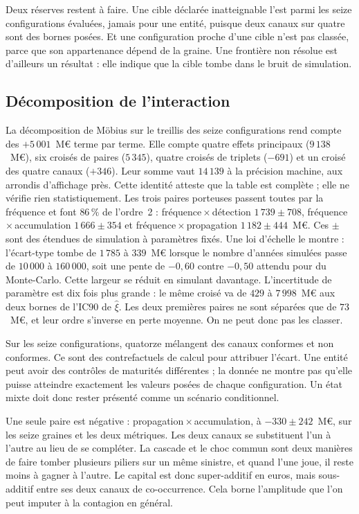 Deux réserves restent à faire. Une cible déclarée inatteignable l'est parmi les seize configurations
évaluées, jamais pour une entité, puisque deux canaux sur quatre sont des bornes posées. Et une configuration proche d'une cible n'est pas
classée, parce que son appartenance dépend de la graine. Une frontière non résolue est d'ailleurs un
résultat : elle indique que la cible tombe dans le bruit de simulation.

\subsection{Décomposition de l'interaction}
\label{sec:interaction-canaux}

La décomposition de Möbius
sur le treillis des seize configurations rend compte des $+5\,001$~M\euro{} terme par terme. Elle compte quatre
effets principaux ($9\,138$~M\euro), six croisés de paires ($5\,345$), quatre croisés de triplets
($-691$) et un croisé des quatre canaux ($+346$). Leur somme vaut $14\,139$ à la précision machine, aux arrondis d'affichage près.
Cette identité atteste que la table est complète ; elle ne vérifie rien statistiquement.
Les trois paires porteuses passent toutes par la fréquence et font $86\,\%$ de l'ordre~2 :
fréquence\,$\times$\,détection $1\,739\pm708$, fréquence\,$\times$\,accumulation $1\,666\pm354$ et
fréquence\,$\times$\,propagation $1\,182\pm444$~M\euro. Ces $\pm$ sont des étendues de simulation à
paramètres fixés. Une loi d'échelle le montre : l'écart-type tombe de $1\,785$ à $339$~M\euro{}
lorsque le nombre d'années simulées passe de $10\,000$ à $160\,000$, soit une pente de $-0{,}60$ contre
$-0{,}50$ attendu pour du Monte-Carlo. Cette largeur se réduit en simulant davantage. L'incertitude
de paramètre est dix fois plus grande : le même croisé va de $429$ à $7\,998$~M\euro{} aux deux bornes
de l'IC90 de $\hat\xi$. Les deux premières paires ne sont séparées que de $73$~M\euro{}, et leur ordre s'inverse en perte
moyenne. On ne peut donc pas les classer.

Sur les seize configurations, quatorze mélangent des canaux conformes et non conformes. Ce sont
des contrefactuels de calcul pour attribuer l'écart. Une entité peut avoir des contrôles de maturités
différentes ; la donnée ne montre pas qu'elle puisse atteindre exactement les valeurs posées de
chaque configuration. Un état mixte doit donc rester présenté comme un scénario conditionnel.

Une seule paire est négative : propagation\,$\times$\,accumulation, à $-330\pm242$~M\euro, sur les
seize graines et les deux métriques. Les deux canaux se substituent l'un à l'autre au lieu de se
compléter. La cascade et le choc commun sont deux manières de faire tomber plusieurs piliers sur un même
sinistre, et quand l'une joue, il reste moins à gagner à l'autre. Le capital est donc super-additif en
euros, mais sous-additif entre ses deux canaux de co-occurrence. Cela borne l'amplitude que l'on peut
imputer à la contagion en général.

